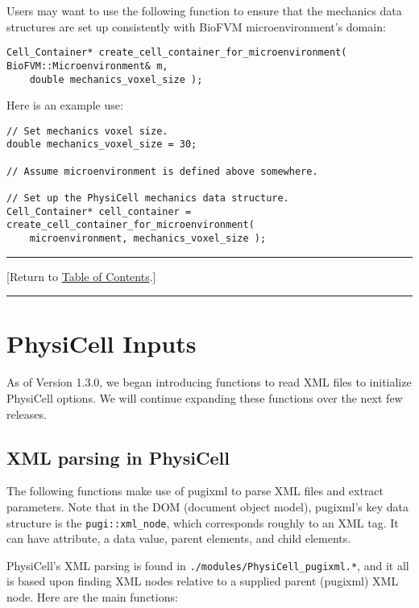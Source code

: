 \documentclass[12pt]{article}
\renewcommand{\v}{\verb}
\newcommand{\TOClink}{\begin{center}\hrule\vskip-10pt\phantom{.}\hfill[Return to \hyperlink{TOC}{Table of Contents}.]\hfill\phantom{.}\vskip3pt\hrule\end{center}}
\begin{document}
Users may want to use the following function to ensure that the mechanics 
data structures are set up consistently with BioFVM microenvironment's 
domain:

\begin{verbatim}
Cell_Container* create_cell_container_for_microenvironment( BioFVM::Microenvironment& m, 
    double mechanics_voxel_size );
\end{verbatim}

Here is an example use: 
\begin{verbatim}
// Set mechanics voxel size. 
double mechanics_voxel_size = 30; 

// Assume microenvironment is defined above somewhere. 

// Set up the PhysiCell mechanics data structure. 
Cell_Container* cell_container = create_cell_container_for_microenvironment(
    microenvironment, mechanics_voxel_size );
\end{verbatim}

\TOClink

\section{PhysiCell Inputs}
As of Version 1.3.0, we began introducing functions to read XML files to initialize 
PhysiCell options. We will continue expanding these functions over the next few 
releases. 

\subsection{XML parsing in PhysiCell}
\label{sec:XML}
The following functions make use of pugixml \cite{ref:pugixml} to parse XML files and 
extract parameters. Note that in the DOM (document object model), pugixml's key data 
structure is the \v|pugi::xml_node|, which corresponds roughly to an XML tag. It 
can have attribute, a data value, parent elements, and child elements. 

PhysiCell's XML parsing is found in \v|./modules/PhysiCell_pugixml.*|, and it all 
is based upon finding XML nodes relative to a supplied parent (pugixml) XML node. 
Here are the main functions: 
 
\end{document}
